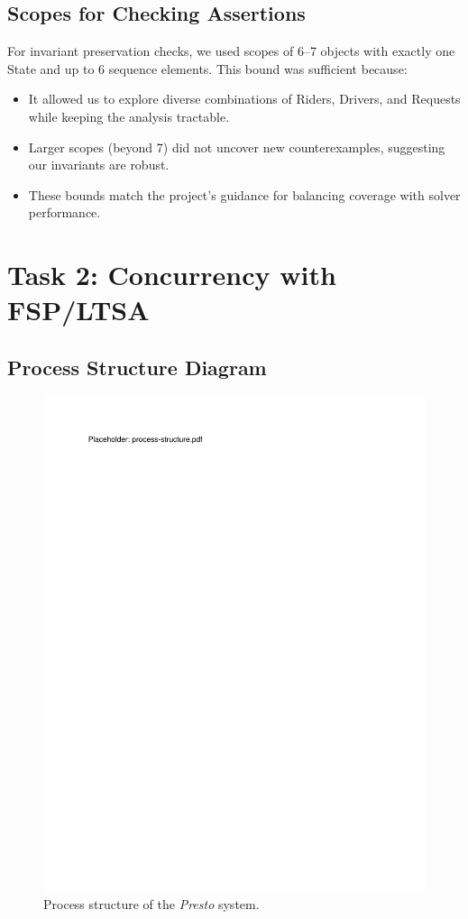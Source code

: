 \documentclass[11pt]{article}
\begin{document}
\subsection{Scopes for Checking Assertions}

For invariant preservation checks, we used scopes of 6–7 objects with exactly one State and up to 6 sequence elements. 
This bound was sufficient because:
\begin{itemize}[leftmargin=1.5em]
  \item It allowed us to explore diverse combinations of Riders, Drivers, and Requests while keeping the analysis tractable.
  \item Larger scopes (beyond 7) did not uncover new counterexamples, suggesting our invariants are robust.
  \item These bounds match the project’s guidance for balancing coverage with solver performance.
\end{itemize}

\section{Task 2: Concurrency with FSP/LTSA}
\label{sec:task2}

\subsection{Process Structure Diagram}

\label{sec:process-structure}
\begin{figure}[h]
  \centering
  \includegraphics[width=1.00\linewidth]{figs/process-structure.pdf}
  \caption{Process structure of the \textit{Presto} system.}
\end{figure}
\end{document}
